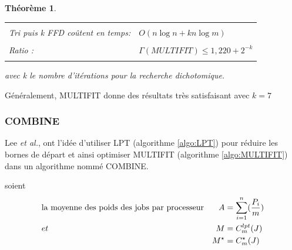 \documentclass[a4paper,12pt]{report}
\theoremstyle{plain}				%
\newtheorem{theoreme}{Théorème}	%
\theoremstyle{definition}				%
\newcommand{\tdi}[1]{\todo[inline]{{#1}}{}}
\newcommand{\lp}[1]{\todo[author=LP,color=yellow,inline]{#1}}
\begin{document}
\begin{theoreme}
\begin{flushleft}
\begin{tabular}{|p{8cm}p{6cm}|}
\hline
& \\
Tri puis k FFD coûtent en temps: & $O(n \log n + kn \log m)$
\\	%
& \\
Ratio \cite{lee1988multiprocessor}:& $\Gamma(MULTIFIT) \leq 1,220 + 2^{-k}$
\\
& \\
\hline
\end{tabular}
\end{flushleft}
avec k le nombre d'itérations pour la recherche dichotomique.
\end{theoreme}

Généralement, MULTIFIT donne des résultats très satisfaisant avec $k = 7$


\subsubsection{COMBINE}

Lee \emph{et al.}, \cite{lee1988multiprocessor} ont l'idée
d'utiliser LPT (algorithme \ref{algo:LPT}) pour réduire les bornes de départ
et ainsi optimiser MULTIFIT (algorithme \ref{algo:MULTIFIT}) dans un algorithme nommé COMBINE.

\bigskip
soient
\begin{align*}
&\textnormal{la moyenne des poids des jobs par processeur} &A &= \sum_{i=1}^{n}(\dfrac{P_i}{m})\\
&et &M &= C_m^{lpt}(J) \\
& &M^\star &= C_m^\star(J)
\end{align*}
\end{document}
